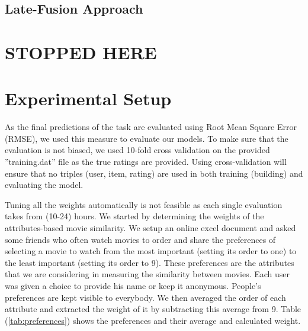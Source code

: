 \documentclass{sigish}
\begin{document}
\subsection{Late-Fusion Approach}





\section{STOPPED HERE}
\section{Experimental Setup}

As the final predictions of the task are evaluated using Root Mean Square Error (RMSE), we used this measure to evaluate our models. To make sure that the evaluation is not biased, we used 10-fold cross validation on the provided ''training.dat'' file as the true ratings are provided. Using cross-validation will ensure that no triples (user, item, rating) are used in both training (building) and evaluating the model.

Tuning all the weights automatically is not feasible as each single evaluation takes from (10-24) hours. We started by determining the weights of the attributes-based movie similarity. We setup an online excel document and asked some friends who often watch movies to order and share the preferences of selecting a movie to watch from the most important (setting its order to one) to the least important (setting its order to 9). These preferences are the attributes that we are considering in measuring the similarity between movies. Each user was given a choice to provide his name or keep it anonymous. People's preferences are kept visible to everybody. We then averaged the order of each attribute and extracted the weight of it by subtracting this average from 9. Table (\ref{tab:preferences}) shows the preferences and their average and calculated weight.
\end{document}
